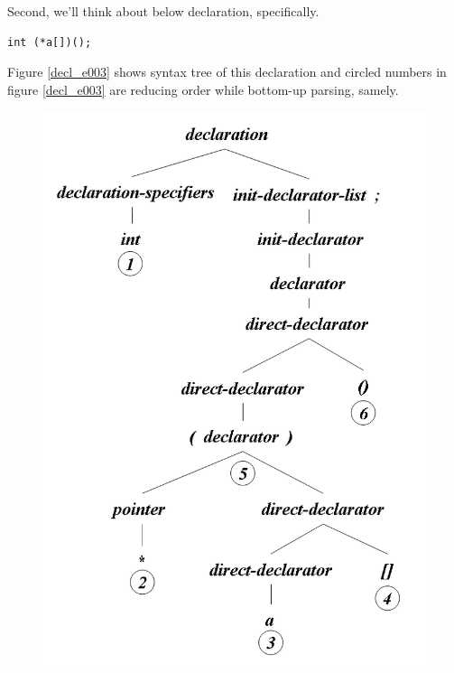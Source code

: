 Second, we'll think about below declaration, specifically.
\begin{verbatim}
int (*a[])();
\end{verbatim}
Figure \ref{decl_e003} shows syntax tree of this declaration
and circled numbers in figure \ref{decl_e003} are reducing order
while bottom-up parsing, samely.
\begin{figure}[htbp]
\begin{center}
\begin{htmlonly}
\includegraphics[width=1.0125\linewidth,height=1.4175\linewidth]{decl003.png}
\end{htmlonly} 
\begin{latexonly}

\end{latexonly}
\end{center}
\end{figure}
